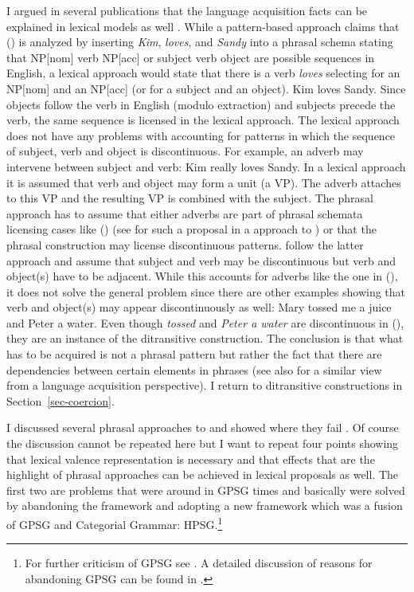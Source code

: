 \documentclass[output=paper]{langsci/langscibook}
\begin{document}
I argued in several publications that the language acquisition facts can be explained in lexical
models as well \parencites[Section~6.3]{MuellerPersian}[Section~9]{MWArgSt}. While a pattern-based approach claims that () is
analyzed by inserting \emph{Kim}, \emph{loves}, and \emph{Sandy} into a phrasal schema stating that
NP[nom] verb NP[acc] or subject verb object are possible sequences in English, a lexical approach
would state that there is a verb \emph{loves} selecting for an NP[nom] and an NP[acc] (or for a
subject and an object).
\ea
Kim loves Sandy.
\z
Since objects follow the verb in English (modulo extraction) and subjects precede the verb, the same
sequence is licensed in the lexical approach. The lexical approach does not have any problems with
accounting for patterns in which the sequence of subject, verb and object is discontinuous. For
example, an adverb may intervene between subject and verb:
\ea
Kim really loves Sandy.
\z
In a lexical approach it is assumed that verb and object may form a unit (a VP). The adverb attaches
to this VP and the resulting VP is combined with the subject. The phrasal approach has to assume
that either adverbs are part of phrasal schemata licensing cases like () (see
 for such a proposal in a \gpsg approach to ) or that the phrasal
construction may license discontinuous patterns. \citet[]{BC2005a} follow the latter approach and
assume that subject and verb may be discontinuous but verb and object(s) have to be adjacent. While
this accounts for adverbs like the one in (), it does not solve the general problem since
there are other examples showing that verb and object(s) may appear discontinuously as well:
\ea
Mary tossed me a juice and Peter a water.
\z
Even though \emph{tossed} and \emph{Peter a water} are discontinuous in (), they are an
instance of the ditransitive construction. The conclusion is that what has to be acquired is not a phrasal pattern but rather the fact that
there are dependencies between certain elements in phrases (see also
\citealt{Behrens2009a} for a similar view from a language acquisition perspective). I return to ditransitive
constructions in Section~\ref{sec-coercion}.%

I discussed several phrasal approaches to  and showed where they fail
\citep{Mueller2006d,Mueller2006c,Mueller2007d,MuellerPersian,MWArgSt,MWArgStReply,MuellerLFGphrasal}. Of course
the discussion cannot be repeated here but I want to repeat four points showing that lexical valence
representation is necessary and that effects that are the highlight of phrasal approaches can be
achieved in lexical proposals as well. The first two are problems that were around in GPSG times and basically
were solved by abandoning the framework and adopting a new framework which was a fusion of GPSG and
Categorial Grammar: HPSG.\footnote{
  For further criticism of GPSG see . A detailed discussion of reasons for
  abandoning GPSG can be found in .
}
\end{document}
